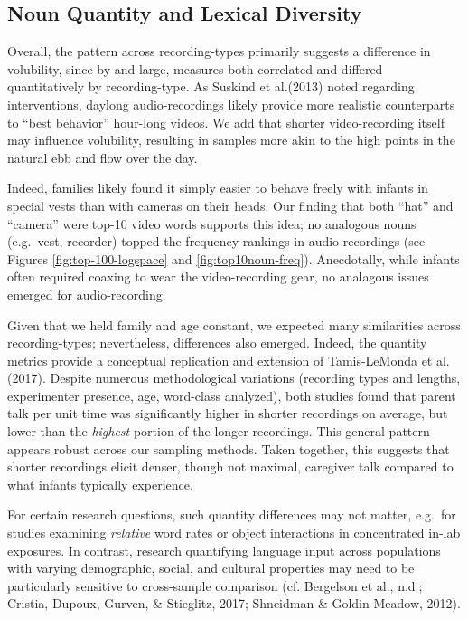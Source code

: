 \documentclass[man]{apa6}
\theoremstyle{definition}
\theoremstyle{definition}
\theoremstyle{definition}
\theoremstyle{remark}
\begin{document}
\hypertarget{noun-quantity-and-lexical-diversity}{%
\subsection{Noun Quantity and Lexical
Diversity}\label{noun-quantity-and-lexical-diversity}}

Overall, the pattern across recording-types primarily suggests a
difference in volubility, since by-and-large, measures both correlated
and differed quantitatively by recording-type. As Suskind et al.(2013)
noted regarding interventions, daylong audio-recordings likely provide
more realistic counterparts to \enquote{best behavior} hour-long videos.
We add that shorter video-recording itself may influence volubility,
resulting in samples more akin to the high points in the natural ebb and
flow over the day.

Indeed, families likely found it simply easier to behave freely with
infants in special vests than with cameras on their heads. Our finding
that both \enquote{hat} and \enquote{camera} were top-10 video words
supports this idea; no analogous nouns (e.g.~vest, recorder) topped the
frequency rankings in audio-recordings (see Figures
\ref{fig:top-100-logspace} and \ref{fig:top10noun-freq}). Anecdotally,
while infants often required coaxing to wear the video-recording gear,
no analagous issues emerged for audio-recording.

Given that we held family and age constant, we expected many
similarities across recording-types; nevertheless, differences also
emerged. Indeed, the quantity metrics provide a conceptual replication
and extension of Tamis-LeMonda et al. (2017). Despite numerous
methodological variations (recording types and lengths, experimenter
presence, age, word-class analyzed), both studies found that parent talk
per unit time was significantly higher in shorter recordings on average,
but lower than the \emph{highest} portion of the longer recordings. This
general pattern appears robust across our sampling methods. Taken
together, this suggests that shorter recordings elicit denser, though
not maximal, caregiver talk compared to what infants typically
experience.

For certain research questions, such quantity differences may not
matter, e.g.~for studies examining \emph{relative} word rates or object
interactions in concentrated in-lab exposures. In contrast, research
quantifying language input across populations with varying demographic,
social, and cultural properties may need to be particularly sensitive to
cross-sample comparison (cf. Bergelson et al., n.d.; Cristia, Dupoux,
Gurven, \& Stieglitz, 2017; Shneidman \& Goldin-Meadow, 2012).
\end{document}
